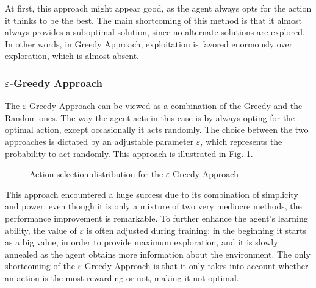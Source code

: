 \documentclass[a4paper, 12pt]{article}
\numberwithin{equation}{section}
\begin{document}
At first, this approach might appear good, as the agent always opts for the action it thinks to be the best. The main shortcoming of this method is that it almost always provides a suboptimal solution, since no alternate solutions are explored. In other words, in Greedy Approach, exploitation is favored enormously over exploration, which is almost absent. 





\subsubsection{$\varepsilon$-Greedy Approach}

The $\varepsilon$-Greedy Approach can be viewed as a combination of the Greedy and the Random ones. The way the agent acts in this case is by always opting for the optimal action, except occasionally it acts randomly. The choice between the two approaches is dictated by an adjustable parameter $\varepsilon$, which represents the probability to act randomly. This approach is illustrated in Fig. \ref{fig:epsilon}.

\begin{figure}[h]
	\centering
		\caption{Action selection distribution for the $\varepsilon$-Greedy Approach}
	\label{fig:epsilon}
\end{figure}

This approach encountered a huge success due to its combination of simplicity and power: even though it is only a mixture of two very mediocre methods, the performance improvement is remarkable. To further enhance the agent's learning ability, the value of $\varepsilon$ is often adjusted during training: in the beginning it starts as a big value, in order to provide maximum exploration, and it is slowly annealed as the agent obtains more information about the environment. The only shortcoming of the $\varepsilon$-Greedy Approach is that it only takes into account whether an action is the most rewarding or not, making it not optimal.
\end{document}
